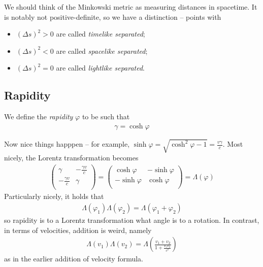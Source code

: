 \documentclass{../template/note}
\begin{document}
    We should think of the Minkowski metric as measuring distances in spacetime. It is notably not positive-definite, so we have a distinction --  points with
    \begin{itemize}
        \item \((\Delta s)^2 > 0\) are called \emph{timelike separated};
        \item \((\Delta s)^2 < 0\) are called \emph{spacelike separated};
        \item \((\Delta s)^2 = 0\) are called \emph{lightlike separated}.
    \end{itemize}
    
    \subsection{Rapidity}

    \begin{definition}[Rapidity]
        We define the \emph{rapidity} \(\varphi\) to be such that 
        \begin{align*}
            \gamma = \cosh \varphi
        \end{align*}
    \end{definition}
    
    Now nice things happpen -- for example, \(\sinh \varphi = \sqrt{\cosh^2 \varphi - 1} = \frac{v\gamma}{c}\). Most nicely, the Lorentz transformation becomes
    \begin{align*}
        \begin{pmatrix}
         \gamma & -\frac{\gamma v}{c} \\
         -\frac{\gamma v}{c} & \gamma \\
        \end{pmatrix} = \begin{pmatrix}
         \cosh \varphi & -\sinh \varphi \\
         -\sinh \varphi & \cosh \varphi \\
        \end{pmatrix} = \Lambda(\varphi)
    \end{align*}
    Particularly nicely, it holds that
    \begin{align*}
        \Lambda(\varphi_1)\Lambda(\varphi_2) = \Lambda(\varphi_1 + \varphi_2)
    \end{align*}
    so rapidity is to a Lorentz transformation what angle is to a rotation. In contrast, in terms of velocities, addition is weird, namely
    \begin{align*}
        \Lambda(v_1)\Lambda(v_2) = \Lambda\left(\frac{v_1+v_2}{1+\frac{v_1v_2}{c^2}}\right)
    \end{align*}
    as in the earlier addition of velocity formula.
    
\end{document}
